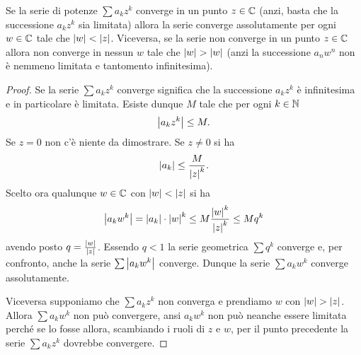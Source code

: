 \begin{theorem}
\mymark{***}
Se la serie di potenze $\sum a_k z^k$ converge in un punto $z\in {\mathbb C}$
(anzi, basta che la successione $a_k z^k$ sia limitata)
allora la serie
converge assolutamente per ogni $w\in {\mathbb C}$ tale che ${\left|w\right|}< {\left|z\right|}$.
Viceversa, se la serie non converge in un punto $z\in {\mathbb C}$
allora
non  converge in nessun $w$ tale che ${\left|w\right|} > {\left|w\right|}$ (anzi la successione
$a_n w^n$ non è nemmeno limitata e tantomento infinitesima).
\end{theorem}
%
\begin{proof}
\mymark{*}
Se la serie $\sum a_k z^k$ converge significa che la successione
$a_k z^k$ è infinitesima e in particolare è limitata.
Esiste dunque $M$ tale che per ogni $k\in {\mathbb N}$
\[
 {\left|a_k z^k\right|} \le M.
\]
Se $z=0$ non c'è niente da dimostrare.
Se $z\neq 0$ si ha
\[
 {\left|a_k\right|} \le \frac{M}{{\left|z\right|}^k}.
\]
Scelto ora qualunque $w\in {\mathbb C}$ con ${\left|w\right|} < {\left|z\right|}$ si ha
\[
  {\left|a_k w^k\right|} = {\left|a_k\right|}\cdot {\left|w\right|}^k \le M \frac{{\left|w\right|}^k}{{\left|z\right|}^k}
  \le M q^k
\]
avendo posto $q = \frac{{\left|w\right|}}{{\left|z\right|}}$.
Essendo $q<1$ la serie geometrica $\sum q^k$ converge e, per confronto,
anche la serie $\sum {\left|a_k w^k\right|}$ converge.
Dunque la serie $\sum a_k w^k$ converge assolutamente.

Viceversa supponiamo che $\sum a_k z^k$ non converga
e prendiamo $w$ con ${\left|w\right|} > {\left|z\right|}$.
Allora $\sum a_k w^k$ non può convergere,
ansi $a_k w^k$ non può neanche essere limitata perché
se lo fosse allora, scambiando i ruoli di $z$ e $w$,
per il punto precedente la serie $\sum a_k z^k$ dovrebbe convergere.
\end{proof}

